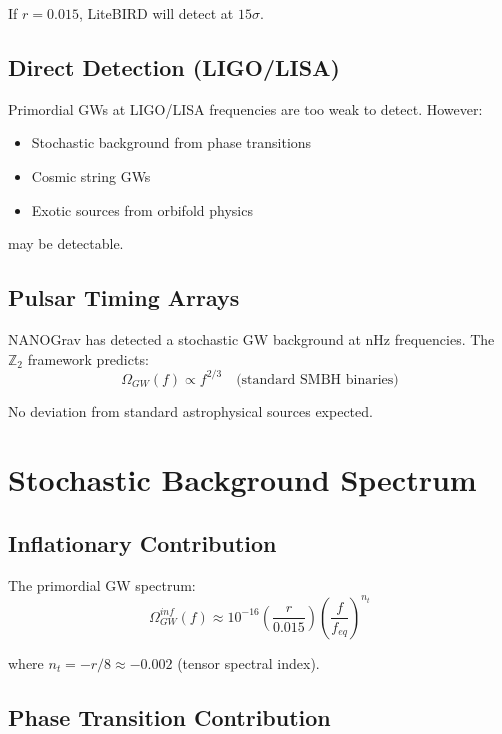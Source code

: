 \documentclass[12pt,a4paper]{article}
\begin{document}
If $r = 0.015$, LiteBIRD will detect at $15\sigma$.

\subsection{Direct Detection (LIGO/LISA)}

Primordial GWs at LIGO/LISA frequencies are too weak to detect. However:
\begin{itemize}
    \item Stochastic background from phase transitions
    \item Cosmic string GWs
    \item Exotic sources from orbifold physics
\end{itemize}

may be detectable.

\subsection{Pulsar Timing Arrays}

NANOGrav has detected a stochastic GW background at nHz frequencies. The $\mathbb{Z}_2$ framework predicts:
\begin{equation}
\Omega_{GW}(f) \propto f^{2/3} \quad \text{(standard SMBH binaries)}
\end{equation}

No deviation from standard astrophysical sources expected.

\section{Stochastic Background Spectrum}

\subsection{Inflationary Contribution}

The primordial GW spectrum:
\begin{equation}
\Omega_{GW}^{inf}(f) \approx 10^{-16} \left(\frac{r}{0.015}\right) \left(\frac{f}{f_{eq}}\right)^{n_t}
\end{equation}

where $n_t = -r/8 \approx -0.002$ (tensor spectral index).

\subsection{Phase Transition Contribution}
\end{document}
